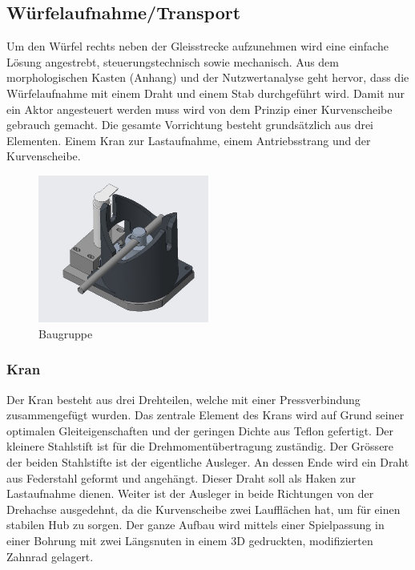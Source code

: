 \documentclass[../../main.tex]{subfiles}
\begin{document}
    \subsection{Würfelaufnahme/Transport}
         Um den Würfel rechts neben der Gleisstrecke aufzunehmen wird eine einfache Lösung angestrebt, steuerungstechnisch sowie mechanisch. Aus dem morphologischen Kasten (Anhang) und der Nutzwertanalyse geht hervor, dass die Würfelaufnahme mit einem Draht und einem Stab durchgeführt wird. Damit nur ein Aktor angesteuert werden muss wird von dem Prinzip einer Kurvenscheibe gebrauch gemacht.  Die gesamte Vorrichtung besteht grundsätzlich aus drei Elementen. Einem Kran zur Lastaufnahme, einem Antriebsstrang und der Kurvenscheibe.

        \begin{figure}[H]
            \centering
            \includegraphics[width=0.5\textwidth]{../../images/Kran/BG.JPG}
            \caption {Baugruppe}
        \end{figure}

    \subsubsection{Kran}
         Der Kran besteht aus drei Drehteilen, welche mit einer Pressverbindung zusammengefügt wurden. Das zentrale Element des Krans wird auf Grund seiner optimalen Gleiteigenschaften und der geringen Dichte aus Teflon gefertigt. Der kleinere Stahlstift ist für die Drehmomentübertragung zuständig. Der Grössere der beiden Stahlstifte ist der eigentliche Ausleger. An dessen Ende wird ein Draht aus Federstahl geformt und angehängt. Dieser Draht soll als Haken zur Lastaufnahme dienen. Weiter ist der Ausleger in beide Richtungen von der Drehachse ausgedehnt, da die Kurvenscheibe zwei Laufflächen hat, um für einen stabilen Hub zu sorgen. Der ganze Aufbau wird mittels einer Spielpassung in einer Bohrung mit zwei Längsnuten in einem 3D gedruckten, modifizierten Zahnrad gelagert.
\end{document}
